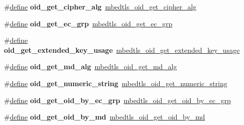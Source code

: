 \begin{DoxyCompactItemize}
\item 
\mbox{\label{compat-1_83_8h_a0762820f6ff18a506a2b30971bbb3e3c}} 
\#\hyperlink{structdefine}{define} {\bfseries oid\+\_\+get\+\_\+cipher\+\_\+alg}~\hyperlink{oid_8h_a16d0ae3b5c5c1a81774677c5c7a9fb97}{mbedtls\+\_\+oid\+\_\+get\+\_\+cipher\+\_\+alg}
\item 
\mbox{\label{compat-1_83_8h_a669c6e94fe5c3f49f633e766d70a1b16}} 
\#\hyperlink{structdefine}{define} {\bfseries oid\+\_\+get\+\_\+ec\+\_\+grp}~\hyperlink{oid_8h_a8c9b600e709bcd6c9bd455db3fb37853}{mbedtls\+\_\+oid\+\_\+get\+\_\+ec\+\_\+grp}
\item 
\mbox{\label{compat-1_83_8h_a692ace1a7556bd14731c5706d27c8434}} 
\#\hyperlink{structdefine}{define} {\bfseries oid\+\_\+get\+\_\+extended\+\_\+key\+\_\+usage}~\hyperlink{oid_8h_a5f8ddcd81a3857571001628d3410bb68}{mbedtls\+\_\+oid\+\_\+get\+\_\+extended\+\_\+key\+\_\+usage}
\item 
\mbox{\label{compat-1_83_8h_adf24ab07a1a5897d5eadb1cfe9686f13}} 
\#\hyperlink{structdefine}{define} {\bfseries oid\+\_\+get\+\_\+md\+\_\+alg}~\hyperlink{oid_8h_ad17c5466d99de2ea8a9c581ecdfbded1}{mbedtls\+\_\+oid\+\_\+get\+\_\+md\+\_\+alg}
\item 
\mbox{\label{compat-1_83_8h_ad30b7ebf01955033e70d02a1290c63f2}} 
\#\hyperlink{structdefine}{define} {\bfseries oid\+\_\+get\+\_\+numeric\+\_\+string}~\hyperlink{oid_8h_afdf526c6529dce3f967ed018f28bed07}{mbedtls\+\_\+oid\+\_\+get\+\_\+numeric\+\_\+string}
\item 
\mbox{\label{compat-1_83_8h_ac3469cf224d052ae4983fa070d59edc4}} 
\#\hyperlink{structdefine}{define} {\bfseries oid\+\_\+get\+\_\+oid\+\_\+by\+\_\+ec\+\_\+grp}~\hyperlink{oid_8h_aa656ad80bf8df19cdc990c0c6efe66eb}{mbedtls\+\_\+oid\+\_\+get\+\_\+oid\+\_\+by\+\_\+ec\+\_\+grp}
\item 
\mbox{\label{compat-1_83_8h_a22a03afd70eda5d23032143ff2acada7}} 
\#\hyperlink{structdefine}{define} {\bfseries oid\+\_\+get\+\_\+oid\+\_\+by\+\_\+md}~\hyperlink{oid_8h_a776c43adb7d25f3cae1b4ab48a70ee5b}{mbedtls\+\_\+oid\+\_\+get\+\_\+oid\+\_\+by\+\_\+md}
\item 
\mbox{\label{compat-1_83_8h_a1938557f1303ad2bd9d796647d62f1da}} 

\end{DoxyCompactItemize}
